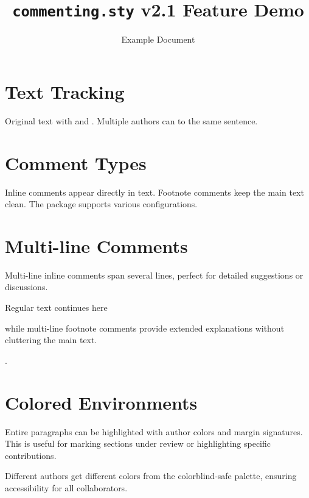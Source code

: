 \documentclass[10pt]{article}
\title{\texttt{commenting.sty} v2.1 Feature Demo}
\author{Example Document}
\date{}
\begin{document}
\maketitle
\vspace{-1em}

\section{Text Tracking}

Original text with  and . Multiple authors can  to the same sentence.

\section{Comment Types}

Inline comments appear directly in text. Footnote comments keep the main text clean. The package supports various configurations.

\section{Multi-line Comments}

\begin{aliceienv}
Multi-line inline comments span several lines,
perfect for detailed suggestions or discussions.
\end{aliceienv}

Regular text continues here\begin{bobfenv}
while multi-line footnote comments
provide extended explanations
without cluttering the main text.
\end{bobfenv}.

\section{Colored Environments}

\begin{aliceenv}
Entire paragraphs can be highlighted with author colors and margin signatures. This is useful for marking sections under review or highlighting specific contributions.
\end{aliceenv}

\vspace{2\baselineskip}

\begin{bobenv}
Different authors get different colors from the colorblind-safe palette, ensuring accessibility for all collaborators.
\end{bobenv}
\end{document}
